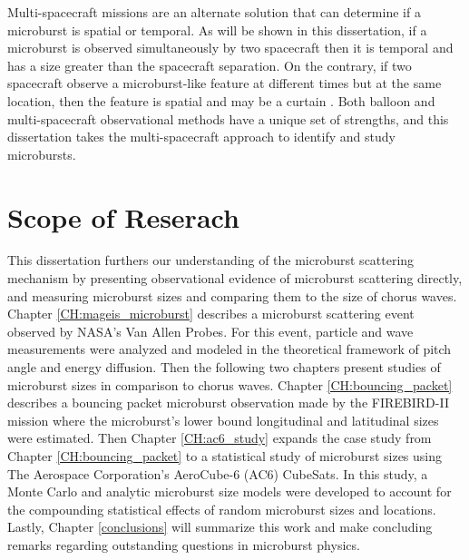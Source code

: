 Multi-spacecraft missions are an alternate solution that can determine if a microburst is spatial or temporal. As will be shown in this dissertation, if a microburst is observed simultaneously by two spacecraft then it is temporal and has a size greater than the spacecraft separation. On the contrary, if two spacecraft observe a microburst-like feature at different times but at the same location, then the feature is spatial and may be a curtain \citep{Blake2016}. Both balloon and multi-spacecraft observational methods have a unique set of strengths, and this dissertation takes the multi-spacecraft approach to identify and study microbursts.


\section{Scope of Reserach}\label{Intro:scope}
This dissertation furthers our understanding of the microburst scattering mechanism by presenting observational evidence of microburst scattering directly, and measuring microburst sizes and comparing them to the size of chorus waves. Chapter \ref{CH:mageis_microburst} describes a microburst scattering event observed by NASA's Van Allen Probes. For this event, particle and wave measurements were analyzed and modeled in the theoretical framework of pitch angle and energy diffusion. Then the following two chapters present studies of microburst sizes in comparison to chorus waves. Chapter \ref{CH:bouncing_packet} describes a bouncing packet microburst observation made by the FIREBIRD-II mission where the microburst's lower bound longitudinal and latitudinal sizes were estimated. Then Chapter \ref{CH:ac6_study} expands the case study from Chapter \ref{CH:bouncing_packet} to a statistical study of microburst sizes using The Aerospace Corporation's AeroCube-6 (AC6) CubeSats. In this study, a Monte Carlo and analytic microburst size models were developed to account for the compounding statistical effects of random microburst sizes and locations. Lastly, Chapter \ref{conclusions} will summarize this work and make concluding remarks regarding outstanding questions in microburst physics.